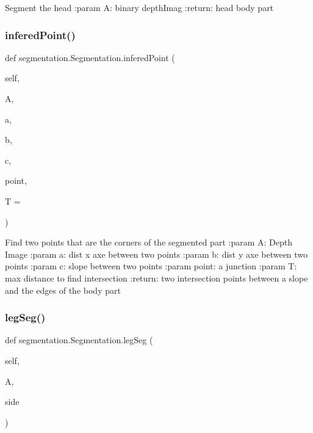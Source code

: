 \begin{DoxyVerb}Segment the head
:param A: binary depthImag
:return: head body part
\end{DoxyVerb}
 \mbox{\label{classsegmentation_1_1_segmentation_abc300f2410a48845de0e9ae32df38241}} 
\subsubsection{\texorpdfstring{infered\+Point()}{inferedPoint()}}
{\footnotesize\ttfamily def segmentation.\+Segmentation.\+infered\+Point (\begin{DoxyParamCaption}\item[{}]{self,  }\item[{}]{A,  }\item[{}]{a,  }\item[{}]{b,  }\item[{}]{c,  }\item[{}]{point,  }\item[{}]{T = {} }\end{DoxyParamCaption})}

\begin{DoxyVerb}Find two points that are the corners of the segmented part
:param A: Depth Image
:param a: dist x axe between two points
:param b: dist y axe between two points
:param c: slope between two points
:param point: a junction
:param T: max distance to find intersection
:return: two intersection points between a slope and the edges of the body part
\end{DoxyVerb}
 \mbox{\label{classsegmentation_1_1_segmentation_a095a3b3205d784d6e7c3e072945ae7a5}} 
\subsubsection{\texorpdfstring{leg\+Seg()}{legSeg()}}
{\footnotesize\ttfamily def segmentation.\+Segmentation.\+leg\+Seg (\begin{DoxyParamCaption}\item[{}]{self,  }\item[{}]{A,  }\item[{}]{side }\end{DoxyParamCaption})}

